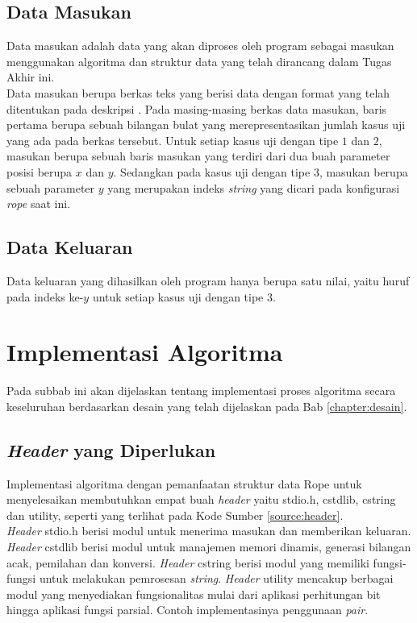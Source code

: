 \subsection{Data Masukan}
Data masukan adalah data yang akan diproses oleh program sebagai masukan menggunakan algoritma dan struktur data yang telah dirancang dalam Tugas Akhir ini.\\
Data masukan berupa berkas teks yang berisi data dengan format yang telah ditentukan pada deskripsi \problem{}. Pada masing-masing berkas data masukan, baris pertama berupa sebuah bilangan bulat yang merepresentasikan jumlah kasus uji yang ada pada berkas tersebut. Untuk setiap kasus uji dengan tipe $1$ dan $2$, masukan berupa sebuah baris masukan yang terdiri dari dua buah parameter posisi berupa $x$ dan $y$. Sedangkan pada kasus uji dengan tipe $3$, masukan berupa sebuah parameter $y$ yang merupakan indeks \textit{string} yang dicari pada konfigurasi \textit{rope} saat ini.

\subsection{Data Keluaran}
Data keluaran yang dihasilkan oleh program hanya berupa satu nilai, yaitu huruf pada indeks ke-$y$ untuk setiap kasus uji dengan tipe $3$. 

\section{Implementasi Algoritma}
Pada subbab ini akan dijelaskan tentang implementasi proses algoritma secara keseluruhan berdasarkan desain yang telah dijelaskan pada Bab \ref{chapter:desain}.

\subsection{\textit{Header} yang Diperlukan}
Implementasi algoritma dengan pemanfaatan struktur data Rope untuk menyelesaikan \problem{} membutuhkan empat buah \textit{header} yaitu stdio.h, cstdlib, cstring dan utility, seperti yang terlihat pada Kode Sumber \ref{source:header}.\\



\textit{Header} stdio.h berisi modul untuk menerima masukan dan memberikan keluaran. \textit{Header} cstdlib berisi modul untuk manajemen memori dinamis, generasi bilangan acak, pemilahan dan konversi. \textit{Header} cstring berisi modul yang memiliki fungsi-fungsi untuk melakukan pemrosesan \textit{string}. \textit{Header} utility mencakup berbagai modul yang menyediakan fungsionalitas mulai dari aplikasi perhitungan bit hingga aplikasi fungsi parsial. Contoh implementasinya penggunaan \textit{pair}. 

